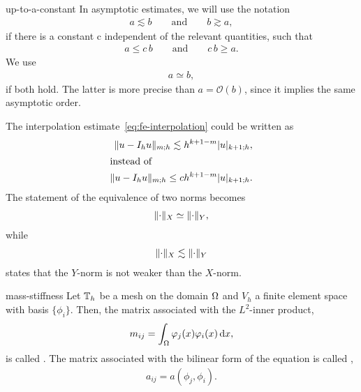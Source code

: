\begin{Notation}{up-to-a-constant}
  In asymptotic estimates, we will use the notation
  \begin{gather*}
    a \lesssim b \qquad\text{and}\qquad b \gtrsim a,
  \end{gather*}
  if there is a constant c independent of the relevant quantities, such that
  \begin{gather*}
    a \le c \,b\qquad\text{and}\qquad c\,b \ge a.
  \end{gather*}
  We use
  \begin{gather*}
    a \simeq b,
  \end{gather*}
  if both hold. The latter is more precise than $a = \mathcal O(b)$,
  since it implies the same asymptotic order.
\end{Notation}

\begin{example}
  The interpolation estimate~\eqref{eq:fe-interpolation} could be written as
  \begin{align*}
    \lVert u-I_h u\rVert_{m;h} \lesssim h^{k+1-m} \lvert u\rvert_{k+1;h},\\
    \intertext{instead of}
    \lVert u-I_h u\rVert_{m;h} \le c h^{k+1-m} \lvert u\rvert_{k+1;h}.
  \end{align*}
  The statement of the equivalence of two norms becomes
  \begin{gather*}
    \lVert\cdot\rVert_X \simeq \lVert\cdot\rVert_Y,
  \end{gather*}
  while 
  \begin{gather*}
    \lVert\cdot\rVert_X \lesssim \lVert\cdot\rVert_Y
  \end{gather*}
  states that the $Y$-norm is not weaker than the $X$-norm.
\end{example}

\begin{Definition}{mass-stiffness}
  Let $\mathbb T_h$ be a mesh on the domain $\Omega$ and $V_h$ a finite
  element space with basis $\{\phi_i\}$. Then, the matrix associated
  with the $L^2$-inner product,
  \begin{gather*}
    m_{ij} = \int_\Omega \varphi_j(x) \varphi_i(x) \,\mathrm{d} x,
  \end{gather*}
  is called . The matrix associated with the
  bilinear form of the equation is called ,
  \begin{gather*}
    a_{ij} = a(\phi_j,\phi_i).
  \end{gather*}
\end{Definition}

